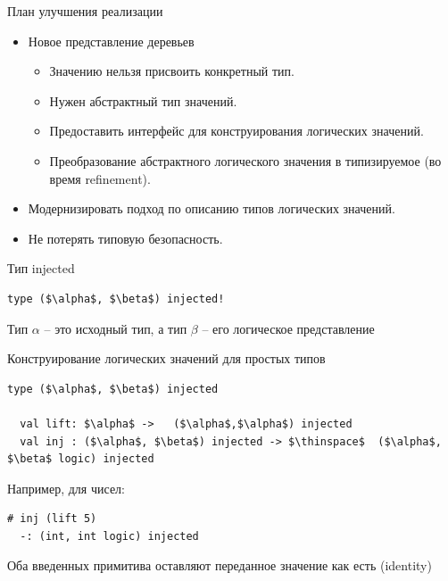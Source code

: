 \documentclass[10pt, mathserif]{beamer}
\theoremstyle{definition}
\begin{document}
\begin{frame}[fragile]{План улучшения реализации}
  \begin{itemize}
  \item Новое представление деревьев
    \begin{itemize}
      \item Значению нельзя присвоить конкретный тип.
      \item Нужен абстрактный тип значений.
      \item Предоставить интерфейс для конструирования логических значений.
      \item Преобразование абстрактного логического значения в типизируемое (во время refinement).
    \end{itemize}
  \item Модернизировать подход по описанию типов логических значений.
  \item Не потерять типовую безопасность.
  \end{itemize}
\end{frame}

\begin{frame}[fragile]{Тип injected}
  \begin{lstlisting}[mathescape=true]
  type ($\alpha$, $\beta$) injected!
  \end{lstlisting}

\vskip 1cm
  Тип $\alpha$ -- это исходный тип, а тип $\beta$ -- его логическое представление
\end{frame}

\begin{frame}[fragile]{Конструирование логических значений для простых типов}
  \begin{lstlisting}[mathescape=true]
  type ($\alpha$, $\beta$) injected

  val lift: $\alpha$ ->   ($\alpha$,$\alpha$) injected
  val inj : ($\alpha$, $\beta$) injected -> $\thinspace$  ($\alpha$, $\beta$ logic) injected
  \end{lstlisting}
  \pause\vskip 1cm
  Например, для чисел:
  \begin{lstlisting}[mathescape=true]
  # inj (lift 5)
  -: (int, int logic) injected
  \end{lstlisting}
  \pause
  Оба введенных примитива оставляют переданное значение как есть (identity)
\end{frame}
\end{document}
